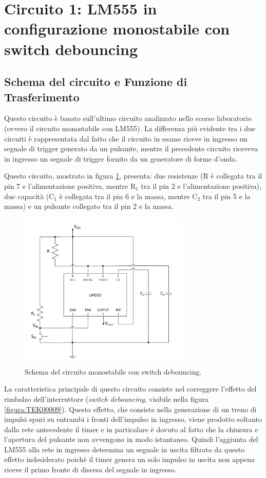 \documentclass{report}
\begin{document}
\newpage
\section{Circuito 1: LM555 in configurazione monostabile con switch debouncing}
\subsection{Schema del circuito e Funzione di Trasferimento}
Questo circuito è basato sull'ultimo circuito analizzato nello scorso laboratorio (ovvero il circuito monostabile con LM555). La differenza più evidente tra i due circuiti è rappresentata dal fatto che il circuito in esame riceve in ingresso un segnale di trigger generato da un pulsante, mentre il precedente circuito riceveva in ingresso un segnale di trigger fornito da un generatore di forme d'onda.

Questo circuito, mostrato in figura \ref{figura:schema1}, presenta: due resistenze (R è collegata tra il pin 7 e l'alimentazione positiva, mentre $\mathrm{R_1}$ tra il pin 2 e l'alimentazione positiva), due capacità ($\mathrm{C_1}$ è collegata tra il pin 6 e la massa, mentre $\mathrm{C_2}$ tra il pin 5 e la massa) e un pulsante collegato tra il pin 2 e la massa.

\begin{figure}[h!]
	\centering
	\includegraphics[height=7.5cm]{immagini/schema1}
	\caption{Schema del circuito monostabile con switch debouncing.}
	\label{figura:schema1}
\end{figure}

\noindent La caratteristica principale di questo circuito consiste nel correggere l'effetto del rimbalzo dell'interruttore (\textit{switch debouncing}, visibile nella figura \ref{figura:TEK00009}). Questo effetto, che consiste nella generazione di un treno di impulsi spuri su entrambi i fronti dell'impulso in ingresso, viene prodotto soltanto dalla rete antecedente il timer e in particolare è dovuto al fatto che la chiusura e l'apertura del pulsante non avvengono in modo istantaneo. Quindi l'aggiunta del LM555 alla rete in ingresso determina un segnale in uscita filtrato da questo effetto indesiderato poichè il timer genera un solo impulso in uscita non appena riceve il primo fronte di discesa del segnale in ingresso.
\end{document}

